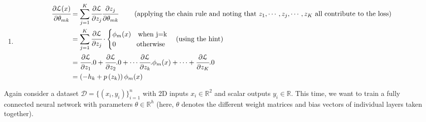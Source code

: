 \begin{solution}
\begin{enumerate}
Marc's version:
\begin{align*}
\LL(x) &= - \sum_i h_i \log p(z_i)  \\
\del_{z_k} \LL(x) &= - \sum_i h_i \frac{1}{p(z_i)}~ \del_{z_k} p(z_i) \\
\del_{z_k} p(z_i) &= \del_{z_k} \frac{e^{z_i}}{\sum_j e^{z_j}} = \d_{ik} \frac{e^{z_k}}{\sum_j e^{z_j}} - \frac{e^{z_i}~ e^{z_k}}{[\sum_j e^{z_j}]^2} = p(z_k)~ [\d_{ik}  - p(z_i)] \\
\del_{z_k} \LL(x) &= - \sum_i h_i \frac{p(z_k)}{p(z_i)}~ [\d_{ik}  - p(z_i)] \\
&= - \sum_i h_i \frac{p(z_k)}{p(z_i)}~  [\d_{ik}] ~-~ \sum_i h_i \frac{p(z_k)}{p(z_i)}~ [- p(z_i)] = h_k - \sum_i h_i p(z_k) = h_k p(z_i)
\end{align*}

\item
\begin{align*}
		\cfrac{\partial \mathcal{L}(x)}{\partial \theta_{mk}} &= \sum_{j=1}^{K} \cfrac{\partial \mathcal{L}}{\partial z_j} \cfrac{\partial z_j}{\partial \theta_{mk}} \quad\quad \text{ (applying the chain rule and noting that $z_1,\cdots,z_j,\cdots,z_K$ all contribute to the loss)}\\
		&=\sum_{j=1}^{K}  \cfrac{\partial \mathcal{L}}{\partial z_j} \cdot \begin{cases}
			\phi_m(x) \quad \text{when j=k}\\
			0 \quad\quad\quad \text{otherwise}\\
		\end{cases} \text{(using the hint)}\\
		&= \cfrac{\partial \mathcal{L}}{\partial z_1}.0 + \cfrac{\partial \mathcal{L}}{\partial z_2}.0 + \cdots \cfrac{\partial \mathcal{L}}{\partial z_k}.\phi_m(x) + \cdots + \cfrac{\partial \mathcal{L}}{\partial z_K}.0 \\
		&= \left(-h_k + p\left(z_k\right)\right)\phi_m(x)
\end{align*}

\end{enumerate}

\end{solution}




Again consider a dataset $\mathcal{D} = \{ (x_i, y_i) \}_{i=1}^n$ with 2D inputs $x_i \in \mathbb{R}^2$ and scalar outputs $y_i \in \mathbb{R}$. This time, we want to train a fully connected neural network with parameters $\theta \in \mathbb{R}^h$ (here, $\theta$ denotes the different weight matrices and bias vectors of individual layers taken together). 

